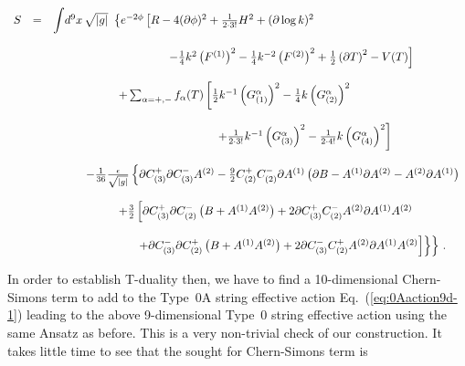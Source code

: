 \documentclass[12pt,a4paper]{article}
\begin{document}
\begin{equation}
\begin{array}{rcl}
S & = & {\displaystyle\int} d^{9}x\,  \sqrt{|g|}\ 
\left\{ e^{-2\phi}
\left[R -4(\partial\phi)^{2} +{\textstyle\frac{1}{2\cdot 3!}}H^{2}
+(\partial\log{k})^{2} 
\right.
\right.\\
& & \\
& &
\hspace{3.5cm}
\left.
-{\textstyle\frac{1}{4}}k^{2} \left(F^{(1)}\right)^{2} 
-{\textstyle\frac{1}{4}}k^{-2}\left(F^{(2)}\right)^{2}
+\textstyle{\frac{1}{2}}\left(\partial T\right)^{2} -V(T)
\right]
\\
& & \\
& & 
\hspace{2cm}
+\sum_{\alpha=+,-}f_{\alpha}(T)
\left[\frac{1}{2}k^{-1}\left(G_{(1)}^{\alpha}\right)^{2} 
-\frac{1}{4}k\left(G_{(2)}^{\alpha}\right)^{2} 
\right.
\\
& & \\
& & 
\hspace{5cm}
\left.
+\frac{1}{2\cdot 3!}k^{-1}\left(G_{(3)}^{\alpha}\right)^{2}
-\frac{1}{2\cdot 4!}k\left(G_{(4)}^{\alpha}\right)^{2}
\right]
\\
& & \\
& & 
\hspace{1cm}
-\frac{1}{36}\frac{\epsilon}{\sqrt{|g|}} 
\left\{ 
\partial C^{+}_{(3)}\partial C^{-}_{(3)} A^{(2)}
-\frac{9}{2} C^{+}_{(2)}C^{-}_{(2)} \partial A^{(1)}
\left(\partial B -A^{(1)}\partial A^{(2)} -A^{(2)}\partial A^{(1)}\right)
\right. 
\\
& & \\
& & 
\hspace{2cm}
+\frac{3}{2}
\left[
\partial C^{+}_{(3)}\partial C^{-}_{(2)} \left(B+A^{(1)}A^{(2)}\right)
+2\partial C^{+}_{(3)}C^{-}_{(2)} A^{(2)} \partial A^{(1)} A^{(2)}
\right.
\\
& & \\
& & 
\hspace{2.5cm}
\left.
\left.
\left.
+\partial C^{-}_{(3)}\partial C^{+}_{(2)} \left(B+A^{(1)}A^{(2)}\right)
+2\partial C^{-}_{(3)}C^{+}_{(2)} A^{(2)} \partial A^{(1)} A^{(2)}
\right]
\right\}
\right\}\, .\\
\end{array}
\label{eq:0action9d}
\end{equation}

In order to establish T-duality then, we have to find a
10-dimensional Chern-Simons term to add to the
Type~0A string effective action Eq.~(\ref{eq:0Aaction9d-1}) leading to
the above 9-dimensional Type~0 string effective action using the same
Ansatz as before. This is a very non-trivial check of our construction.
It takes little time to see that the sought for Chern-Simons term is
\end{document}
